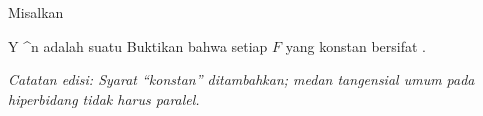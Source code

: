 {}
{

Misalkan

\mavergleichskette
{\vergleichskette
{ Y
}
{ \subseteq }{ \R^n
}
{  }{
}
{    }{
}
{   }{
}
}
{}{}{}
adalah suatu
Buktikan bahwa setiap
$F$ yang konstan
 {} {}
bersifat
 {}{}{.}

\emph{Catatan edisi: Syarat ``konstan'' ditambahkan; medan tangensial umum pada hiperbidang tidak harus paralel.}

}
{} {}


